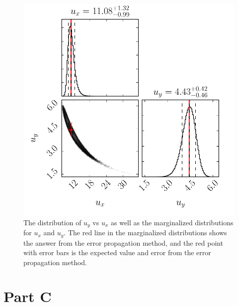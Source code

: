 \documentclass[12pt,a4paper]{article}
\begin{document}
\begin{enumerate}[a)]
 \begin{figure}[ht]
  \centering
  \includegraphics[keepaspectratio]{hw2_b_corner.pdf}
  \caption{The distribution of $u_y$ vs $u_x$ as well as the marginalized distributions for $u_x$ and $u_y$. The red line in the marginalized distributions shows the answer from the error propagation method, and the red point with error bars is the expected value and error from the error propagation method.}
  \label{fig:corner}
 \end{figure}
\end{enumerate}

\section{Part C}
\label{sec:partC}
\end{document}
